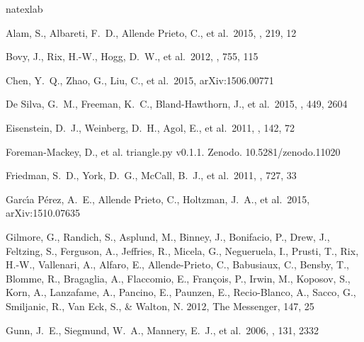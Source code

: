 \documentclass[12pt, letterpaper, preprint]{aastex}
\begin{document}
\begin{thebibliography}{24}
\expandafter\ifx\csname natexlab\endcsname\relax\def\natexlab#1{#1}\fi

 Alam, S., Albareti, F.~D., 
Allende Prieto, C., et al.\ 2015, \apjs, 219, 12 

 Bovy, J., Rix, H.-W., Hogg, D.~W., et al.\ 2012, \apj, 755, 115

 Chen, Y.~Q., Zhao, G., 
Liu, C., et al.\ 2015, arXiv:1506.00771 

 De Silva, G.~M., 
Freeman, K.~C., Bland-Hawthorn, J., et al.\ 2015, \mnras, 449, 2604 

 Eisenstein, D.~J., 
Weinberg, D.~H., Agol, E., et al.\ 2011, \aj, 142, 72 

Foreman-Mackey, D., et al. triangle.py v0.1.1. Zenodo. 10.5281/zenodo.11020

 Friedman, S.~D., York, 
D.~G., McCall, B.~J., et al.\ 2011, \apj, 727, 33 

Garc{\'{\i}}a P{\'e}rez, A.~E., Allende Prieto, C., Holtzman, J.~A., et 
al.\ 2015, arXiv:1510.07635 

{Gilmore}, G., {Randich}, S., {Asplund}, M., {Binney}, J., {Bonifacio}, P.,
  {Drew}, J., {Feltzing}, S., {Ferguson}, A., {Jeffries}, R., {Micela}, G.,
  {Negueruela}, I., {Prusti}, T., {Rix}, H.-W., {Vallenari}, A., {Alfaro}, E.,
  {Allende-Prieto}, C., {Babusiaux}, C., {Bensby}, T., {Blomme}, R.,
  {Bragaglia}, A., {Flaccomio}, E., {Fran{\c c}ois}, P., {Irwin}, M.,
  {Koposov}, S., {Korn}, A., {Lanzafame}, A., {Pancino}, E., {Paunzen}, E.,
  {Recio-Blanco}, A., {Sacco}, G., {Smiljanic}, R., {Van Eck}, S., \& {Walton},
  N. 2012, The Messenger, 147, 25

 Gunn, J.~E., Siegmund, 
W.~A., Mannery, E.~J., et al.\ 2006, \aj, 131, 2332 


\end{thebibliography}
\end{document}
